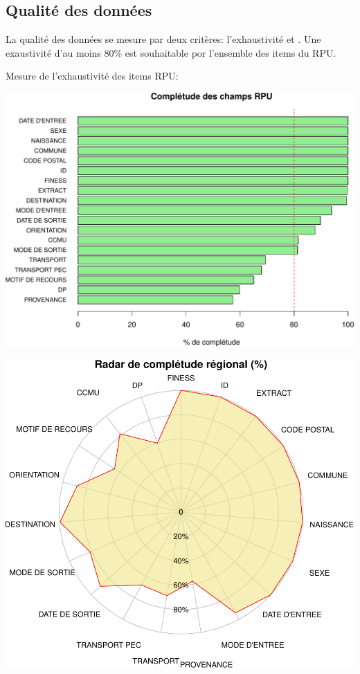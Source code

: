 \documentclass[]{article}
\begin{document}
\subsection{Qualité des données}\label{qualite-des-donnees-1}

La qualité des données se mesure par deux critères: l'exhaustivité et .
Une exaustivité d'au moins 80\% est souhaitable por l'ensemble des items
du RPU.

Mesure de l'exhaustivité des items RPU:

\includegraphics{rapport2014_V4_files/figure-latex/completude-1.pdf}

\includegraphics{rapport2014_V4_files/figure-latex/radar-1.pdf}
\end{document}
